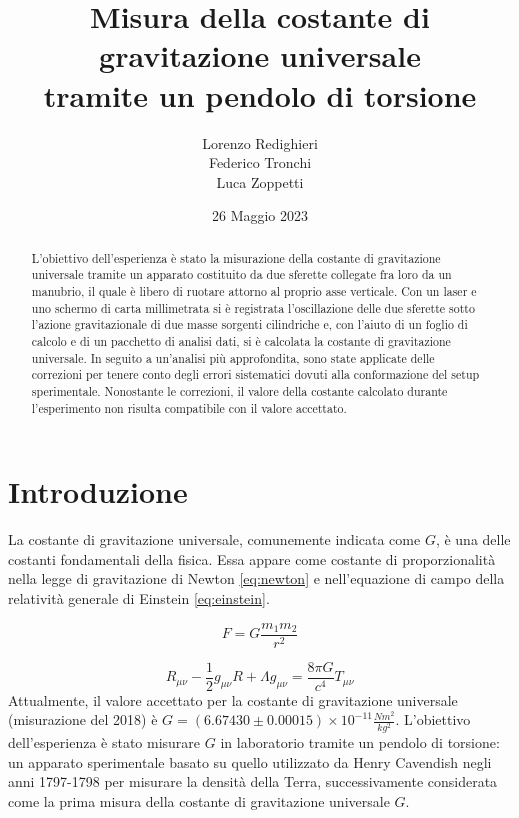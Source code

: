 \documentclass{article}
\title{Misura della costante di gravitazione universale\\tramite un pendolo di torsione}
\author{Lorenzo Redighieri\\Federico Tronchi\\Luca Zoppetti}
\date{26 Maggio 2023}
\begin{document}
\maketitle

\begin{abstract}
L'obiettivo dell'esperienza è stato la misurazione della costante di gravitazione universale tramite un apparato costituito da due sferette collegate fra loro da un manubrio, il quale è libero di ruotare attorno al proprio asse verticale. Con un laser e uno schermo di carta millimetrata si è registrata l'oscillazione delle due sferette sotto l'azione gravitazionale di due masse sorgenti cilindriche e, con l'aiuto di un foglio di calcolo e di un pacchetto di analisi dati, si è calcolata la costante di gravitazione universale. In seguito a un'analisi più approfondita, sono state applicate delle correzioni per tenere conto degli errori sistematici dovuti alla conformazione del setup sperimentale. Nonostante le correzioni, il valore della costante calcolato durante l'esperimento non risulta compatibile con il valore accettato.
\end{abstract}

\newpage

\section{Introduzione}
La costante di gravitazione universale, comunemente indicata come $G$, è una delle costanti fondamentali della fisica. Essa appare come costante di proporzionalità nella legge di gravitazione di Newton \eqref{eq:newton} e nell'equazione di campo della relatività generale di Einstein \eqref{eq:einstein}.

\begin{equation} \label{eq:newton}
    F=G\frac{m_1m_2}{r^2}
\end{equation}

\begin{equation} \label{eq:einstein}
    R_{\mu \nu} - \frac{1}{2}g_{\mu \nu}R + \Lambda g_{\mu \nu} = \frac{8 \pi G}{c^4}T_{\mu \nu}
\end{equation}
Attualmente, il valore accettato per la costante di gravitazione universale (misurazione del 2018) è $\displaystyle G=(6.67430 \pm 0.00015) \times 10^{-11} \frac{Nm^2}{kg^2}$. L'obiettivo dell'esperienza è stato misurare $G$ in laboratorio tramite un pendolo di torsione: un apparato sperimentale basato su quello utilizzato da Henry Cavendish\cite{cavendish} negli anni 1797-1798 per misurare la densità della Terra, successivamente considerata come la prima misura della costante di gravitazione universale $G$.
\end{document}
